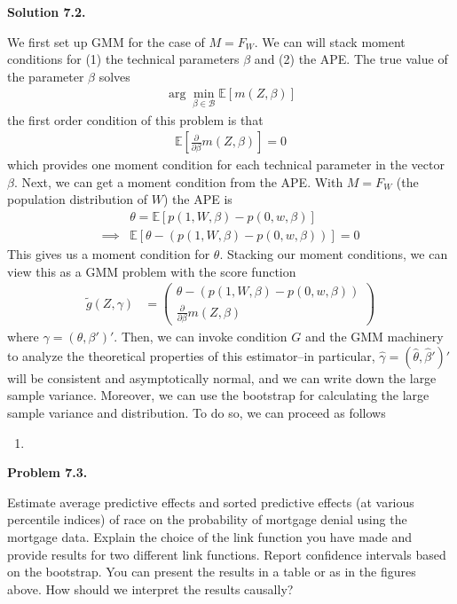 \documentclass[11pt]{article}
\newenvironment{problem}[1]
    {\bigskip\noindent\textbf{Problem #1.}\par\setlength{\parindent}{0pt}}
    {\medskip}
\newenvironment{solution}[1]
    {\bigskip\noindent\textbf{Solution #1.} \par}
    {\medskip}
\newcommand{\ev}{\mathbb{E}}
\begin{document}
\begin{solution}{7.2}
We first set up GMM for the case of $M = F_W.$ We can will stack moment conditions for (1) the technical parameters $\beta$ and (2) the APE. The true value of the parameter $\beta$ solves
\begin{align*}
    \arg\min_{\beta \in \mathcal{B}} \ev[m(Z,\beta)]
\end{align*}
the first order condition of this problem is that 
\begin{align*}
    \ev\left[ \frac{\partial}{\partial \beta}m(Z,\beta)\right] = 0
\end{align*}
which provides one moment condition for each technical parameter in the vector $\beta.$ Next, we can get a moment condition from the APE. With $M = F_W$ (the population distribution of $W$) the APE is 
\begin{align*}
    &\theta = \ev[p(1,W,\beta) - p(0,w,\beta)] \\
    \implies& \ev[\theta - (p(1,W,\beta) - p(0,w,\beta))] = 0
\end{align*}
This gives us a moment condition for $\theta.$ Stacking our moment conditions, we can view this as a GMM problem with the score function 
\begin{align*}
    \tilde{g}(Z,\gamma) &=
    \begin{pmatrix}
        \theta - (p(1,W,\beta) - p(0,w,\beta)) \\
        \frac{\partial}{\partial \beta}m(Z,\beta)
    \end{pmatrix}
\end{align*}
where $\gamma = (\theta,\beta')'.$ Then, we can invoke  condition $G$ and the GMM machinery to analyze the theoretical properties of this estimator--in particular, $\hat{\gamma} = (\hat{\theta},\hat{\beta}')'$ will be consistent and asymptotically normal, and we can write down the large sample variance. Moreover, we can use the bootstrap for calculating the large sample variance and distribution. To do so, we can proceed as follows
\begin{enumerate}
    \item 
\end{enumerate}


\end{solution}
\newpage
\begin{problem}{7.3}
Estimate average predictive effects and sorted predictive
effects (at various percentile indices) of race on the probability
of mortgage denial using the mortgage data. Explain
the choice of the link function you have made and provide
results for two different link functions. Report confidence
intervals based on the bootstrap. You can present the results
in a table or as in the figures above. How should we interpret
the results causally?
\end{problem}
\end{document}
